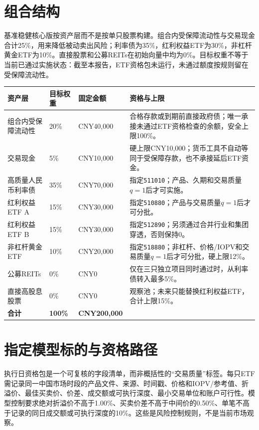\section{组合结构}

基准稳健核心版按资产层而不是按单只股票构建。组合内受保障流动性与交易现金合计25\%，用来降低被动卖出风险；利率债为35\%，红利权益ETF为30\%，非杠杆黄金ETF为10\%。直接股票和公募REITs在初始向量中均为0\%。目标权重不等于当前已通过实施状态：截至本报告，ETF资格包未运行，未通过额度按规则留在受保障流动性。

\begin{exhibitbox}[基准稳健核心版]
\small
\begin{tabularx}{\exhibitboxwidth}{L{3.1cm}P P P}
\toprule
\textbf{资产层} & \textbf{目标权重} & \textbf{固定金额} & \textbf{资格与上限} \\
\midrule
组合内受保障流动性 & 20\% & CNY40,000 & 合格存款或到期前直接政府债；唯一承接未通过ETF资格检查的余额，安全上限100\%。 \\
交易现金 & 5\% & CNY10,000 & 硬上限CNY10,000；货币工具不自动等同于受保障存款，也不承接延后ETF资金。 \\
高质量人民币利率债 & 35\% & CNY70,000 & 指定\texttt{511010}；产品、久期和交易质量$q=1$后才可实施。 \\
红利权益ETF A & 15\% & CNY30,000 & 指定\texttt{510880}；产品与交易质量$q=1$后才可分批。 \\
红利权益ETF B & 15\% & CNY30,000 & 指定\texttt{512890}；另须通过合并行业和集团穿透，否则保持0。 \\
非杠杆黄金ETF & 10\% & CNY20,000 & 指定\texttt{518880}；非杠杆、价格/IOPV和交易质量$q=1$后才可分批，硬上限12\%。 \\
公募REITs & 0\% & CNY0 & 仅在三只独立项目同时通过时，从利率债转入最多5\%。 \\
直接高股息股票 & 0\% & CNY0 & 观察池；未来只能替换红利权益ETF，合计上限15\%。 \\
\midrule
\textbf{合计} & \textbf{100\%} & \textbf{CNY200,000} & \\
\bottomrule
\end{tabularx}
\end{exhibitbox}

\section{指定模型标的与资格路径}

执行日资格包是一个可复核的字段清单，而非概括性的“交易质量”标签。每只ETF需记录同一中国市场时段的产品文件、来源、时间戳、价格和IOPV/参考值、折溢价、最佳买卖价、价差、成交额或可执行深度、最小交易单位和账户可行性。模型控制要求绝对折溢价不高于1.00\%、买卖价差不高于中间价的0.50\%、单笔不高于记录的同日成交额或可执行深度的10\%。这些是风险控制规则，不是当前市场观察。

